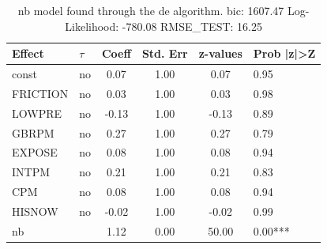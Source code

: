 \begin{table}
	\caption{nb model found through the de algorithm. bic: 1607.47 Log-Likelihood: -780.08 RMSE_TEST: 16.25}
	\begin{center}
		\begin{tabular}{|l|l|c|c|c|l|}
			\hline
			Effect & $\tau$ & Coeff & Std. Err & z-values & Prob |z|>Z \\
			\hline
			const & no & 0.07 & 1.00 & 0.07 & 0.95 \\
			\hline
			FRICTION & no & 0.03 & 1.00 & 0.03 & 0.98 \\
			\hline
			LOWPRE & no & -0.13 & 1.00 & -0.13 & 0.89 \\
			\hline
			GBRPM & no & 0.27 & 1.00 & 0.27 & 0.79 \\
			\hline
			EXPOSE & no & 0.08 & 1.00 & 0.08 & 0.94 \\
			\hline
			INTPM & no & 0.21 & 1.00 & 0.21 & 0.83 \\
			\hline
			CPM & no & 0.08 & 1.00 & 0.08 & 0.94 \\
			\hline
			HISNOW & no & -0.02 & 1.00 & -0.02 & 0.99 \\
			\hline
			nb &  & 1.12 & 0.00 & 50.00 & 0.00*** \\
			\hline
		\end{tabular}
	\end{center}
\end{table}